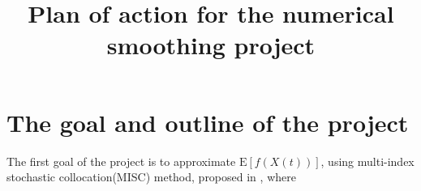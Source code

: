 \documentclass[11pt]{article}
\title{Plan of action for the numerical smoothing project}
\newcommand{\expt}[1]{\mathrm{E}\left[#1\right]}
\begin{document}
\maketitle







\thispagestyle{plain}

\setcounter{tocdepth}{1}

\section{The goal and outline of the project}
The first goal of the project is to approximate $\expt{f(X(t))}$, using multi-index stochastic collocation(MISC) method, proposed in \cite{haji2016multi},  where 
\end{document}
